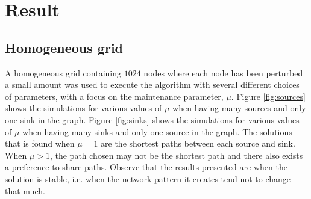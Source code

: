 \section{Result}
\label{sec:result}

\subsection{Homogeneous grid}
A homogeneous grid containing $1024$ nodes where each node has been perturbed a small amount was used to execute the algorithm with several different choices of parameters, with a focus on the maintenance parameter, $\mu$. Figure \ref{fig:sources} shows the simulations for various values of $\mu$ when having many sources and only one sink in the graph. Figure \ref{fig:sinks} shows the simulations for various values of $\mu$ when having many sinks and only one source in the graph. The solutions that is found when $\mu=1$ are the shortest paths between each source and sink. When $\mu > 1$, the path chosen may not be the shortest path and there also exists a preference to share paths. Observe that the results presented are when the solution is stable, i.e. when the network pattern it creates tend not to change that much.

